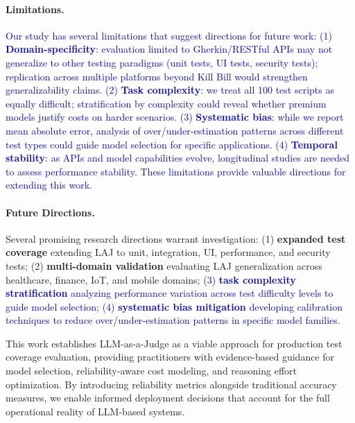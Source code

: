 \documentclass[letterpaper]{article} %
\newcommand{\add}[1]{\textcolor{blue}{#1}}
\newcommand{\add}[1]{#1}
\begin{document}
\paragraph{Limitations.} \add{Our study has several limitations that suggest directions for future work: (1) \textbf{Domain-specificity}: evaluation limited to Gherkin/RESTful APIs may not generalize to other testing paradigms (unit tests, UI tests, security tests); replication across multiple platforms beyond Kill Bill would strengthen generalizability claims. (2) \textbf{Task complexity}: we treat all 100 test scripts as equally difficult; stratification by complexity could reveal whether premium models justify costs on harder scenarios. 
(3) \textbf{Systematic bias}: while we report mean absolute error, analysis of over/under-estimation patterns across different test types could guide model selection for specific applications. (4) \textbf{Temporal stability}: as APIs and model capabilities evolve, longitudinal studies are needed to assess performance stability. These limitations provide valuable directions for extending this work.}

\paragraph{Future Directions.} Several promising research directions warrant investigation: (1) \textbf{expanded test coverage} extending LAJ to unit, integration, UI, performance, and security tests; (2) \textbf{multi-domain validation} evaluating LAJ generalization across healthcare, finance, IoT, and mobile domains; 
\add{
(3) \textbf{task complexity stratification} analyzing performance 
variation across test difficulty levels to guide model selection; 
(4) \textbf{systematic bias mitigation} developing calibration 
techniques to reduce over/under-estimation patterns in specific 
model families.
}

This work establishes LLM-as-a-Judge as a viable approach for production test coverage evaluation, providing practitioners with evidence-based guidance for model selection, reliability-aware cost modeling, and reasoning effort optimization. By introducing reliability metrics alongside traditional accuracy measures, we enable informed deployment decisions that account for the full operational reality of LLM-based systems. %



\end{document}
